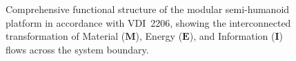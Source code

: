 \begin{figure}[ht!]
{\begin{tikzpicture}
\end{tikzpicture}%
}
\caption{Comprehensive functional structure of the modular semi-humanoid platform in accordance with VDI~2206, showing the interconnected transformation of Material ($\mathbf{M}$), Energy ($\mathbf{E}$), and Information ($\mathbf{I}$) flows across the system boundary.}
\label{fig:functional_structure}
\end{figure}
